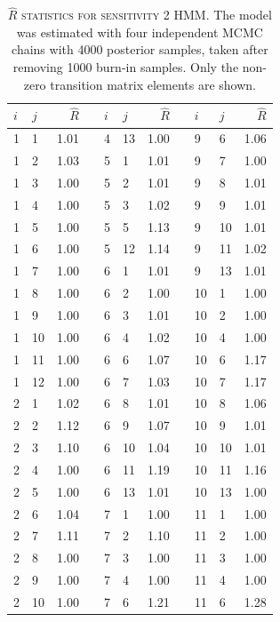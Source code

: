 \begin{table}[h!]
 \centering
 \caption[Convergence statistics for sensitivity 2 HMM]{\textsc{$\hat{R}$ statistics for sensitivity 2 HMM}. The model was estimated with four independent MCMC chains with \num{4000} posterior samples, taken after removing \num{1000} burn-in samples. Only the non-zero transition matrix elements are shown.}
 \begin{tabular}{llrp{0.2cm}llrp{0.2cm}llr}
 \hline
 $i$ & $j$ & $\hat{R}$ & &  $i$ & $j$ & $\hat{R}$ & & $i$ & $j$ & $\hat{R}$ \\
 \hline\hline
 1 & 1 & 1.01  & & 4 & 13 & 1.00 & & 9 & 6 & 1.06 \\
 1 & 2 & 1.03  & & 5 & 1 & 1.01 &  &9 & 7 & 1.00 \\
 1 & 3 & 1.00  & & 5 & 2 & 1.01 &  &9 & 8 & 1.01 \\
 1 & 4 & 1.00  & & 5 & 3 & 1.02 &  &9 & 9 & 1.01 \\
 1 & 5 & 1.00  & & 5 & 5 & 1.13 &  &9 & 10 & 1.01 \\
 1 & 6 & 1.00  & & 5 & 12 & 1.14 & & 9 & 11 & 1.02 \\
 1 & 7 & 1.00  & & 6 & 1 & 1.01 &  &9 & 13 & 1.01 \\
 1 & 8 & 1.00  & & 6 & 2 & 1.00 &  &10 & 1 & 1.00 \\
 1 & 9 & 1.00  & & 6 & 3 & 1.01 &  &10 & 2 & 1.00 \\
 1 & 10 & 1.00 &  & 6 & 4 & 1.02 & & 10 & 4 & 1.00 \\
 1 & 11 & 1.00 &  & 6 & 6 & 1.07 & & 10 & 6 & 1.17 \\
 1 & 12 & 1.00 &  & 6 & 7 & 1.03 & & 10 & 7 & 1.17 \\
 2 & 1 & 1.02  & & 6 & 8 & 1.01 &  &10 & 8 & 1.06 \\
 2 & 2 & 1.12  & & 6 & 9 & 1.07 &  &10 & 9 & 1.01 \\
 2 & 3 & 1.10  & & 6 & 10 & 1.04 & & 10 & 10 & 1.01 \\
 2 & 4 & 1.00  & & 6 & 11 & 1.19 & & 10 & 11 & 1.16 \\
 2 & 5 & 1.00  & & 6 & 13 & 1.01 & & 10 & 13 & 1.00 \\
 2 & 6 & 1.04  & & 7 & 1 & 1.00 &  &11 & 1 & 1.00 \\
 2 & 7 & 1.11  & & 7 & 2 & 1.10 &  &11 & 2 & 1.00 \\
 2 & 8 & 1.00  & & 7 & 3 & 1.00 &  &11 & 3 & 1.00 \\
 2 & 9 & 1.00  & & 7 & 4 & 1.00 &  &11 & 4 & 1.00 \\
 2 & 10 & 1.00 &  & 7 & 6 & 1.21 & & 11 & 6 & 1.28 \\

\end{tabular}
\end{table}

